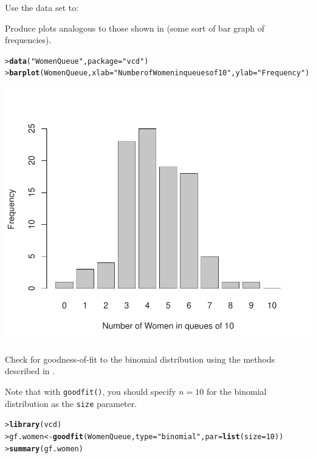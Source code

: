 \documentclass[10pt]{report}\usepackage[]{graphicx}\usepackage[]{color}
\makeatletter
\newcommand{\hlnum}[1]{\textcolor[rgb]{0.686,0.059,0.569}{#1}}%
\newcommand{\hlstr}[1]{\textcolor[rgb]{0.192,0.494,0.8}{#1}}%
\newcommand{\hlstd}[1]{\textcolor[rgb]{0.345,0.345,0.345}{#1}}%
\newcommand{\hlkwb}[1]{\textcolor[rgb]{0.69,0.353,0.396}{#1}}%
\newcommand{\hlkwc}[1]{\textcolor[rgb]{0.333,0.667,0.333}{#1}}%
\newcommand{\hlkwd}[1]{\textcolor[rgb]{0.737,0.353,0.396}{\textbf{#1}}}%
\newenvironment{kframe}{%
 \def\at@end@of@kframe{}%
 \ifinner\ifhmode%
  \def\at@end@of@kframe{\end{minipage}}%
  \begin{minipage}{\columnwidth}%
 \fi\fi%
 \def\FrameCommand##1{\hskip\@totalleftmargin \hskip-\fboxsep
 \colorbox{shadecolor}{##1}\hskip-\fboxsep
     \hskip-\linewidth \hskip-\@totalleftmargin \hskip\columnwidth}%
 \MakeFramed {\advance\hsize-\width
   \@totalleftmargin\z@ \linewidth\hsize
   \@setminipage}}%
 {\par\unskip\endMakeFramed%
 \at@end@of@kframe}
\newenvironment{knitrout}{}{} %
\renewenvironment{knitrout}{\small\renewcommand{\baselinestretch}{.85}}{} %
\makeatother
\begin{document}
\begin{Exercises}
  \exercise Use the data set  to:
  \begin{enumerate*}
    \item Produce plots analogous to those
  shown in  (some sort of bar graph of frequencies).
    \begin{ans}
\begin{knitrout}\footnotesize
{}\color{fgcolor}\begin{kframe}
\begin{alltt}
\hlstd{> }\hlkwd{data}\hlstd{(}\hlstr{"WomenQueue"}\hlstd{,} \hlkwc{package} \hlstd{=} \hlstr{"vcd"}\hlstd{)}
\hlstd{> }\hlkwd{barplot}\hlstd{(WomenQueue,} \hlkwc{xlab}\hlstd{=}\hlstr{"Number of Women in queues of 10"}\hlstd{,} \hlkwc{ylab}\hlstd{=} \hlstr{"Frequency"}\hlstd{)}
\end{alltt}
\end{kframe}

\centerline{\includegraphics[width=.5\textwidth]{soln/fig/ex3_3a-1} }



\end{knitrout}
    \end{ans}

    \item Check for goodness-of-fit to the binomial distribution using the
     methods described in .
    \begin{ans}
    Note that with \texttt{goodfit()}, you should specify $n=10$ for the binomial distribution as the \texttt{size} parameter.
\begin{knitrout}\footnotesize
{}\color{fgcolor}\begin{kframe}
\begin{alltt}
\hlstd{> }\hlkwd{library}\hlstd{(vcd)}
\hlstd{> }\hlstd{gf.women} \hlkwb{<-} \hlkwd{goodfit}\hlstd{(WomenQueue,} \hlkwc{type} \hlstd{=} \hlstr{"binomial"}\hlstd{,} \hlkwc{par}\hlstd{=}\hlkwd{list}\hlstd{(}\hlkwc{size}\hlstd{=}\hlnum{10}\hlstd{))}
\hlstd{> }\hlkwd{summary}\hlstd{(gf.women)}
\end{alltt}
\begin{verbatim}


\end{verbatim}
\end{kframe}
\end{knitrout}
\end{ans}
\end{enumerate*}
\end{Exercises}
\end{document}
